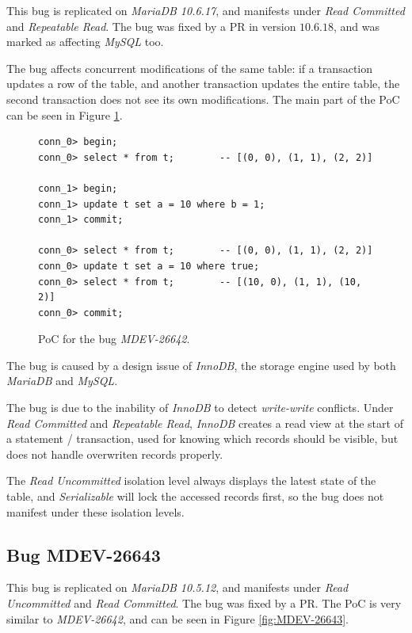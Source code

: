 This bug is replicated on \textit{MariaDB 10.6.17}, and manifests under \textit{Read Committed} and \textit{Repeatable Read}. The bug was fixed by a PR in version \textit{$10.6.18$}, and was marked as affecting \textit{MySQL} too.


The bug affects concurrent modifications of the same table: if a transaction updates a row of the table, and another transaction updates the entire table, the second transaction does not see its own modifications. The main part of the PoC can be seen in Figure \ref{fig:MDEV-26642}.


\begin{figure}
\begin{verbatim}
conn_0> begin;
conn_0> select * from t;        -- [(0, 0), (1, 1), (2, 2)]

conn_1> begin;
conn_1> update t set a = 10 where b = 1;
conn_1> commit;

conn_0> select * from t;        -- [(0, 0), (1, 1), (2, 2)]
conn_0> update t set a = 10 where true;
conn_0> select * from t;        -- [(10, 0), (1, 1), (10, 2)]
conn_0> commit;
\end{verbatim}
\caption{PoC for the bug \textit{MDEV-26642}.} \label{fig:MDEV-26642}
\end{figure}

The bug is caused by a design issue of \textit{InnoDB}, the storage engine used by both \textit{MariaDB} and \textit{MySQL}.

The bug is due to the inability of \textit{InnoDB} to detect \textit{write-write} conflicts. Under \textit{Read Committed} and \textit{Repeatable Read}, \textit{InnoDB} creates a read view at the start of a statement / transaction, used for knowing which records should be visible, but does not handle overwriten records properly. 

The \textit{Read Uncommitted} isolation level always displays the latest state of the table, and \textit{Serializable} will lock the accessed records first, so the bug does not manifest under these isolation levels.

\subsection*{Bug MDEV-26643}


This bug is replicated on \textit{MariaDB 10.5.12}, and manifests under \textit{Read Uncommitted} and \textit{Read Committed}. The bug was fixed by a PR. The PoC is very similar to \textit{MDEV-26642}, and can be seen in Figure \ref{fig:MDEV-26643}.


